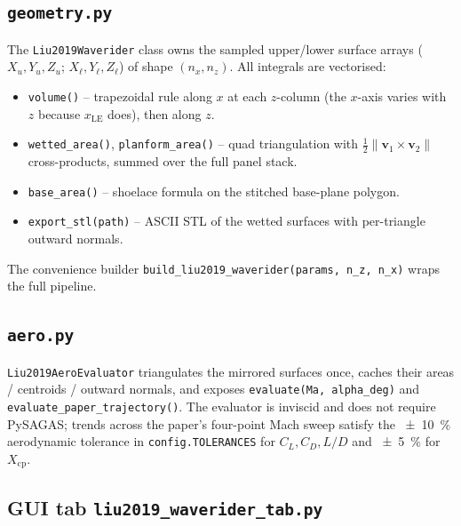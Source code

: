 \documentclass[11pt,a4paper]{article}
\begin{document}
\subsection{\texttt{geometry.py}}

The \texttt{Liu2019Waverider} class owns the sampled upper/lower
surface arrays ($X_{u}, Y_{u}, Z_{u}$; $X_{\ell}, Y_{\ell}, Z_{\ell}$)
of shape $(n_{x}, n_{z})$. All integrals are vectorised:
\begin{itemize}\setlength\itemsep{0pt}
\item \texttt{volume()} -- trapezoidal rule along $x$ at each $z$-column
      (the $x$-axis varies with $z$ because $x_{\mathrm{LE}}$ does),
      then along $z$.
\item \texttt{wetted\_area()}, \texttt{planform\_area()} -- quad
      triangulation with $\tfrac{1}{2}\|\mathbf{v}_{1}\times\mathbf{v}_{2}\|$
      cross-products, summed over the full panel stack.
\item \texttt{base\_area()} -- shoelace formula on the stitched
      base-plane polygon.
\item \texttt{export\_stl(path)} -- ASCII STL of the wetted surfaces
      with per-triangle outward normals.
\end{itemize}
The convenience builder \texttt{build\_liu2019\_waverider(params,
n\_z, n\_x)} wraps the full pipeline.

\subsection{\texttt{aero.py}}

\texttt{Liu2019AeroEvaluator} triangulates the mirrored surfaces once,
caches their areas / centroids / outward normals, and exposes
\texttt{evaluate(Ma, alpha\_deg)} and
\texttt{evaluate\_paper\_trajectory()}. The evaluator is inviscid and
does not require PySAGAS; trends across the paper's four-point Mach
sweep satisfy the \SI{\pm 10}{\percent} aerodynamic tolerance in
\texttt{config.TOLERANCES} for $C_{L}, C_{D}, L/D$ and \SI{\pm 5}{\percent}
for $X_{\mathrm{cp}}$.

\subsection{GUI tab \texttt{liu2019\_waverider\_tab.py}}
\end{document}
